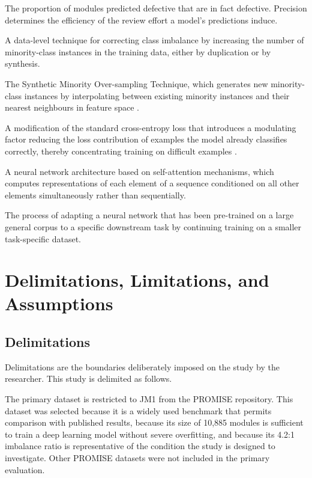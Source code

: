 \documentclass[12pt,a4paper,oneside]{report}
\begin{document}
\begin{description}[leftmargin=0em,style=nextline,itemsep=6pt]
  \item[Precision:] The proportion of modules predicted defective that are in fact defective. Precision determines the efficiency of the review effort a model's predictions induce.

  \item[Oversampling:] A data-level technique for correcting class imbalance by increasing the number of minority-class instances in the training data, either by duplication or by synthesis.

  \item[SMOTE:] The Synthetic Minority Over-sampling Technique, which generates new minority-class instances by interpolating between existing minority instances and their nearest neighbours in feature space \cite{chawla2002}.

  \item[Focal Loss:] A modification of the standard cross-entropy loss that introduces a modulating factor reducing the loss contribution of examples the model already classifies correctly, thereby concentrating training on difficult examples \cite{lin2017}.

  \item[Transformer:] A neural network architecture based on self-attention mechanisms, which computes representations of each element of a sequence conditioned on all other elements simultaneously rather than sequentially.

  \item[Fine-tuning:] The process of adapting a neural network that has been pre-trained on a large general corpus to a specific downstream task by continuing training on a smaller task-specific dataset.
\end{description}

\section{Delimitations, Limitations, and Assumptions}

\subsection{Delimitations}

Delimitations are the boundaries deliberately imposed on the study by the researcher. This study is delimited as follows.

The primary dataset is restricted to JM1 from the PROMISE repository. This dataset was selected because it is a widely used benchmark that permits comparison with published results, because its size of 10,885 modules is sufficient to train a deep learning model without severe overfitting, and because its 4.2:1 imbalance ratio is representative of the condition the study is designed to investigate. Other PROMISE datasets were not included in the primary evaluation.
\end{document}

